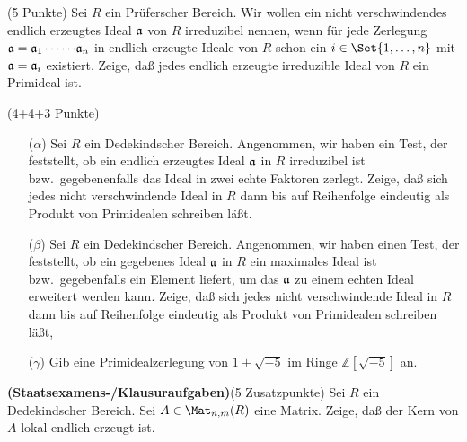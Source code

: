 \documentclass{algsheet}
\begin{document}
\begin{exercise}(5 Punkte)\newline
    Sei \(R\) ein Prüferscher Bereich. Wir wollen ein nicht verschwindendes
    endlich erzeugtes
    Ideal \(\mathfrak{a}\) von \(R\) irreduzibel nennen, wenn für jede
    Zerlegung \(\mathfrak{a} = \mathfrak{a}_1 \dotsm \mathfrak{\dotsm} \mathfrak{a}_n\) in
    endlich erzeugte Ideale von \(R\) schon ein \(i \in \Set{1, \dotsc, n}\) mit
    \(\mathfrak{a} = \mathfrak{a}_i\) existiert. Zeige, daß jedes endlich erzeugte irreduzible 
    Ideal von \(R\) ein Primideal ist.
\end{exercise}

 
\begin{exercise}(4+4+3 Punkte)\vspace{-1ex}
      \begin{itemize}
   \item [($\alpha$)]     Sei \(R\) ein Dedekindscher Bereich. Angenommen, wir haben ein Test, der
    feststellt, ob ein endlich erzeugtes Ideal \(\mathfrak{a}\) in \(R\) irreduzibel ist 
    bzw.~gegebenenfalls das Ideal in zwei echte Faktoren zerlegt. Zeige, daß
    sich jedes nicht verschwindende Ideal in \(R\) dann bis auf Reihenfolge
    eindeutig als Produkt von Primidealen schreiben läßt.
   \item [($\beta$)]     Sei \(R\) ein Dedekindscher Bereich. Angenommen, wir haben einen Test, der
    feststellt, ob ein gegebenes Ideal \(\mathfrak{a}\) in \(R\) ein maximales
    Ideal ist bzw.~gegebenfalls ein Element liefert, um das \(\mathfrak{a}\) zu einem
    echten Ideal erweitert werden kann. Zeige, daß 
    sich jedes nicht verschwindende Ideal in \(R\) dann bis auf Reihenfolge
    eindeutig als Produkt von Primidealen schreiben läßt,
    \item [($\gamma$)]  Gib eine Primidealzerlegung von \(1 + \sqrt{-5}\) im Ringe \(\mathbb Z[\sqrt{-5}]\)
  an.
  \end{itemize}
\end{exercise}


\begin{exercise}\textbf{(Staatsexamens-/Klausuraufgaben)}(5 Zusatzpunkte)\newline
    Sei \(R\) ein Dedekindscher Bereich. Sei \(A \in \Mat_{n, m}(R)\) eine Matrix.
    Zeige, daß der Kern von \(A\) lokal endlich erzeugt ist.
\end{exercise}
\end{document}
